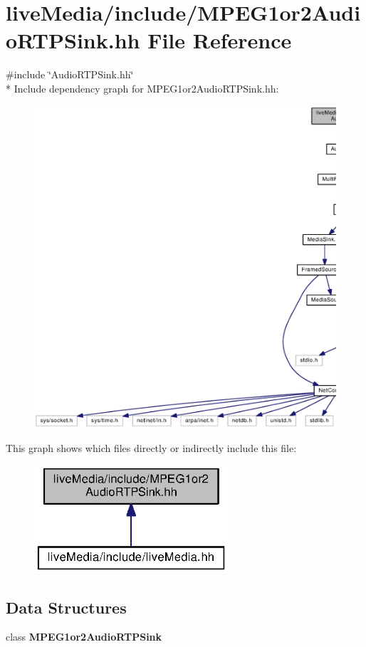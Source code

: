 \section{live\+Media/include/\+M\+P\+E\+G1or2\+Audio\+R\+T\+P\+Sink.hh File Reference}
\label{MPEG1or2AudioRTPSink_8hh}
{\ttfamily \#include \char`\"{}Audio\+R\+T\+P\+Sink.\+hh\char`\"{}}\\*
Include dependency graph for M\+P\+E\+G1or2\+Audio\+R\+T\+P\+Sink.\+hh\+:
\nopagebreak
\begin{figure}[H]
\begin{center}
\leavevmode
\includegraphics[width=350pt]{MPEG1or2AudioRTPSink_8hh__incl}
\end{center}
\end{figure}
This graph shows which files directly or indirectly include this file\+:
\nopagebreak
\begin{figure}[H]
\begin{center}
\leavevmode
\includegraphics[width=204pt]{MPEG1or2AudioRTPSink_8hh__dep__incl}
\end{center}
\end{figure}
\subsection*{Data Structures}
\begin{DoxyCompactItemize}
\item 
class {\bf M\+P\+E\+G1or2\+Audio\+R\+T\+P\+Sink}
\end{DoxyCompactItemize}
